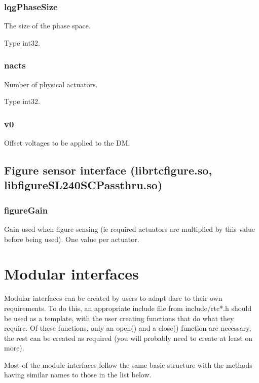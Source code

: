 \documentclass[a4,10pt]{article}
\begin{document}
\subsubsection{lqgPhaseSize}
The size of the phase space.

Type int32.

\subsubsection{nacts}
Number of physical actuators.

Type int32.

\subsubsection{v0}
Offset voltages to be applied to the DM.




\subsection{Figure sensor interface (librtcfigure.so, libfigureSL240SCPassthru.so)}
\subsubsection{figureGain}
Gain used when figure sensing (ie required actuators are multiplied by
this value before being used).  One value per actuator.



\section{Modular interfaces}
Modular interfaces can be created by users to adapt darc to their own
requirements.  To do this, an appropriate include file from
include/rtc*.h should be used as a template, with the user creating
functions that do what they require.  Of these functions, only an
open() and a close() function are necessary, the rest can be created
as required (you will probably need to create at least on more).

Most of the module interfaces follow the same basic structure with the
methods having similar names to those in the list below.
\end{document}
